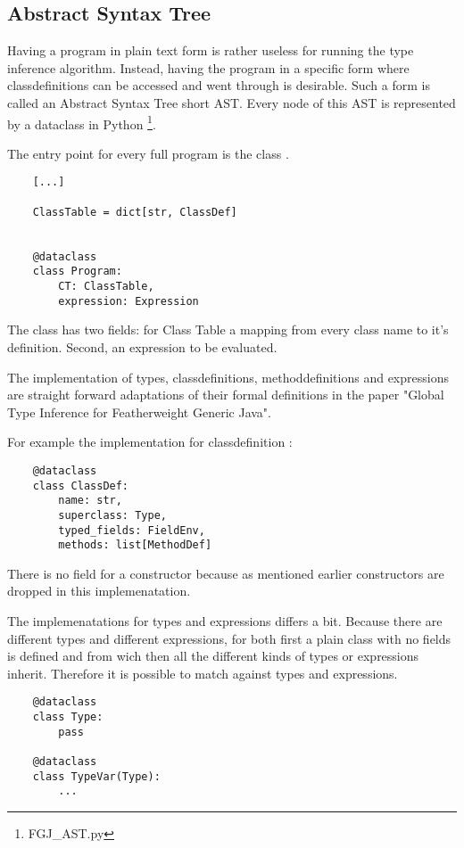 \subsection{Abstract Syntax Tree}

Having a program in plain text form is rather useless for running the type inference algorithm. Instead, having the program in a specific form where classdefinitions can be accessed and went through is desirable.
Such a form is called an Abstract Syntax Tree short AST. Every node of this AST is represented by a dataclass in Python \footnote{FGJ\_AST.py}.

The entry point for every full program is the class .
\begin{verbatim}
    [...]

    ClassTable = dict[str, ClassDef]


    @dataclass
    class Program:
        CT: ClassTable,
        expression: Expression
\end{verbatim}

The class  has two fields:  for Class Table a mapping from every class name to it's definition. Second,  an expression to be evaluated.

The implementation of types, classdefinitions, methoddefinitions and expressions are straight forward adaptations of their formal definitions in the paper "Global Type Inference for Featherweight Generic
Java".

For example the implementation for classdefinition :
\begin{verbatim}
    @dataclass
    class ClassDef:
        name: str,
        superclass: Type,
        typed_fields: FieldEnv,
        methods: list[MethodDef]
\end{verbatim}

There is no field for a constructor because as mentioned earlier constructors are dropped in this implemenatation.

The implemenatations for types and expressions differs a bit. Because there are different types and different expressions, for both first a plain class with no fields is defined  and  from wich then all the different kinds of types or expressions inherit.
Therefore it is possible to match against types and expressions.

\begin{verbatim}
    @dataclass
    class Type:
        pass

    @dataclass
    class TypeVar(Type):
        ...
\end{verbatim}


